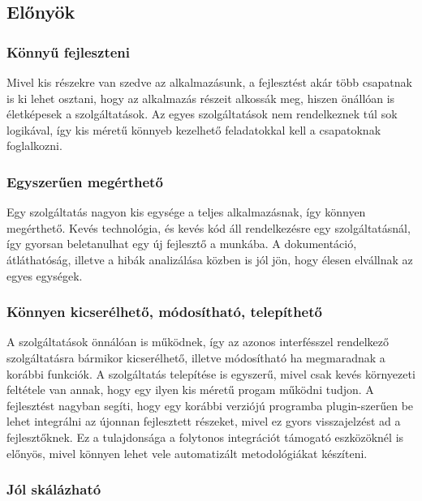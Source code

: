\documentclass[11pt,magyar,a4paper,twoside,]{report}
\begin{document}
\subsection{Előnyök}\label{elux151nyuxf6k}

\subsubsection{Könnyű fejleszteni}\label{kuxf6nnyux171-fejleszteni}

Mivel kis részekre van szedve az alkalmazásunk, a fejlesztést akár több
csapatnak is ki lehet osztani, hogy az alkalmazás részeit alkossák meg,
hiszen önállóan is életképesek a szolgáltatások. Az egyes szolgáltatások
nem rendelkeznek túl sok logikával, így kis méretű könnyeb kezelhető
feladatokkal kell a csapatoknak foglalkozni.

\subsubsection{Egyszerűen
megérthető}\label{egyszerux171en-meguxe9rthetux151}

Egy szolgáltatás nagyon kis egysége a teljes alkalmazásnak, így könnyen
megérthető. Kevés technológia, és kevés kód áll rendelkezésre egy
szolgáltatásnál, így gyorsan beletanulhat egy új fejlesztő a munkába. A
dokumentáció, átláthatóság, illetve a hibák analizálása közben is jól
jön, hogy élesen elvállnak az egyes egységek.

\subsubsection{Könnyen kicserélhető, módosítható,
telepíthető}\label{kuxf6nnyen-kicseruxe9lhetux151-muxf3dosuxedthatuxf3-telepuxedthetux151}

A szolgáltatások önnálóan is működnek, így az azonos interfésszel
rendelkező szolgáltatásra bármikor kicserélhető, illetve módosítható ha
megmaradnak a korábbi funkciók. A szolgáltatás telepítése is egyszerű,
mivel csak kevés környezeti feltétele van annak, hogy egy ilyen kis
méretű progam működni tudjon. A fejlesztést nagyban segíti, hogy egy
korábbi verziójú programba plugin-szerűen be lehet integrálni az újonnan
fejlesztett részeket, mivel ez gyors visszajelzést ad a fejlesztőknek.
Ez a tulajdonsága a folytonos integrációt támogató eszközöknél is
előnyös, mivel könnyen lehet vele automatizált metodológiákat készíteni.

\subsubsection{Jól skálázható}\label{juxf3l-skuxe1luxe1zhatuxf3}
\end{document}
